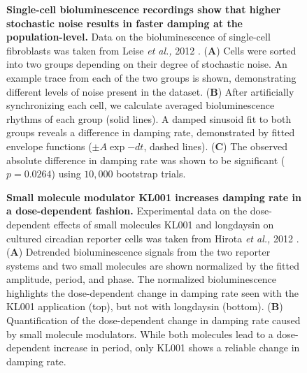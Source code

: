 \documentclass[11pt, letterpaper]{article}
\begin{document}
\begin{figure}[h!]
  \begin{center}
  \end{center}
  \caption{{\bfseries Single-cell bioluminescence recordings show that higher stochastic noise results in faster damping at the population-level.}
  Data on the bioluminescence of single-cell fibroblasts was taken from Leise {\itshape et al.,} 2012 \cite{Leise2012}.
({\bfseries A}) Cells were sorted into two groups depending on their degree of stochastic noise. An example trace from each of the two groups is shown, demonstrating different levels of noise present in the dataset.
({\bfseries B}) After artificially synchronizing each cell, we calculate averaged bioluminescence rhythms of each group (solid lines). A damped sinusoid fit to both groups reveals a difference in damping rate, demonstrated by fitted envelope functions ($\pm A\exp{-dt}$, dashed lines).
({\bfseries C}) The observed absolute difference in damping rate was shown to be significant ($p = 0.0264$) using $10,000$ bootstrap trials.}
\label{fig:fibroblast_noise}
\end{figure}

\begin{figure}[h!]
  \begin{center}
  \end{center}
  \caption{{\bfseries Small molecule modulator KL001 increases damping rate in a dose-dependent fashion.}
  Experimental data on the dose-dependent effects of small molecules KL001 and longdaysin on cultured circadian reporter cells was taken from Hirota {\itshape et al.,} 2012 \cite{Hirota2012}.
({\bfseries A}) Detrended bioluminescence signals from the two reporter systems and two small molecules are shown normalized by the fitted amplitude, period, and phase. The normalized bioluminescence highlights the dose-dependent change in damping rate seen with the KL001 application (top), but not with longdaysin (bottom).
({\bfseries B}) Quantification of the dose-dependent change in damping rate caused by small molecule modulators. While both molecules lead to a dose-dependent increase in period, only KL001 shows a reliable change in damping rate.}
\label{fig:dose_dependence}
\end{figure}
\end{document}

